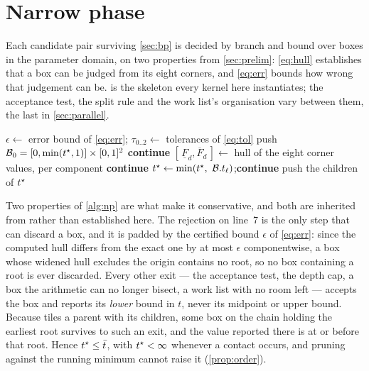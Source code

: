 \section{Narrow phase}
\label{sec:np}

Each candidate pair surviving \cref{sec:bp} is decided by branch and bound over
boxes in the parameter domain, on two properties from \cref{sec:prelim}:
\cref{eq:hull} establishes that a box can be judged from its eight corners, and
\cref{eq:err} bounds how wrong that judgement can be.  is the
skeleton every kernel here instantiates; the acceptance test, the split rule and
the work list's organisation vary between them, the last in \cref{sec:parallel}.

\begin{algorithm}[htbp]
\caption{Branch and bound for one query. $\toi$ is the running minimum, shared
across queries when the caller asks only for the earliest impact.}
\label{alg:np}
\small
\begin{algorithmic}[1]
  \State $\epsilon \gets$ error bound of \cref{eq:err};\quad
         $\tau_{0..2} \gets$ tolerances of \cref{eq:tol}
  \State push $\mathcal{B}_{0} = [0,\min(t^{\star},1)]\times[0,1]^{2}$
     \textbf{continue}
    \EndIf
    \State $[\,\underline{F}_{d},\overline{F}_{d}\,] \gets$ hull of the eight
           corner values, per component 
      \State \textbf{continue} 
    \EndIf
      \State $\toi \gets \min(\toi,\ \dom.t_{\ell})$;\quad \textbf{continue}
    \EndIf
    \State push the children of 
  \EndWhile
  \State \Return $\toi$
\EndFunction
\end{algorithmic}
\end{algorithm}

Two properties of \cref{alg:np} are what make it conservative, and both are
inherited from \citet{wang2021tight} rather than established here. The rejection
on line~7 is the only step that can discard a box, and it is padded by the
certified bound $\epsilon$ of \cref{eq:err}: since the computed hull differs from
the exact one by at most $\epsilon$ componentwise, a box whose widened hull
excludes the origin contains no root, so no box containing a root is ever
discarded. Every other exit --- the acceptance test, the depth cap, a box the
arithmetic can no longer bisect, a work list with no room left --- accepts the box
and reports its \emph{lower} bound in $t$, never its midpoint or upper bound.
Because  tiles a parent with its children, some box on the chain
holding the earliest root survives to such an exit, and the value reported there
is at or before that root. Hence $t^{\star} \le \bar{t}$, with $t^{\star} < \infty$
whenever a contact occurs, and pruning against the running minimum cannot raise
it (\cref{prop:order}).

